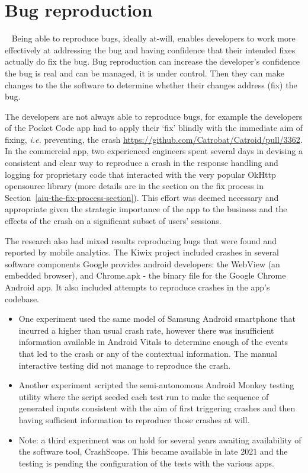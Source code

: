 \section{Bug reproduction}~\label{aiu-bug-reproduction}
Being able to reproduce bugs, ideally at-will, enables developers to work more effectively at addressing the bug and having confidence that their intended fixes actually do fix the bug. 
Bug reproduction can increase the developer's confidence the bug is real and can be managed, it is under control. Then they can make changes to the the software to determine whether their changes address (fix) the bug. 

The developers are not always able to reproduce bugs, for example the developers of the Pocket Code app had to apply their `fix' blindly with the immediate aim of fixing, \emph{i.e.} preventing, the crash \url{https://github.com/Catrobat/Catroid/pull/3362}.  In the commercial app, two experienced engineers spent several days in devising a consistent and clear way to reproduce a crash in the response handling and logging for proprietary code that interacted with the very popular OkHttp opensource library (more details are in the section on the fix process in Section~\ref{aiu-the-fix-process-section}). This effort was deemed necessary and appropriate given the strategic importance of the app to the business and the effects of the crash on a significant subset of users' sessions.

The research also had mixed results reproducing bugs that were found and reported by mobile analytics.
%
The Kiwix project included crashes in several software components Google provides android developers: the WebView (an embedded browser), and Chrome.apk - the binary file for the Google Chrome Android app. It also included attempts to reproduce crashes in the app's codebase. 

\begin{itemize}
    \item One experiment used the same model of Samsung Android smartphone that incurred a higher than usual crash rate, however there was insufficient information available in Android Vitals to determine enough of the events that led to the crash or any of the contextual information. The manual interactive testing did not manage to reproduce the crash.
    \item Another experiment scripted the semi-autonomous Android Monkey testing utility where the script seeded each test run to make the sequence of generated inputs consistent with the aim of first triggering crashes and then having sufficient information to reproduce those crashes at will.
    \item Note: a third experiment was on hold for several years awaiting availability of the software tool, CrashScope. This became available in late 2021 and the testing is pending the configuration of the tests with the various apps.
\end{itemize}

